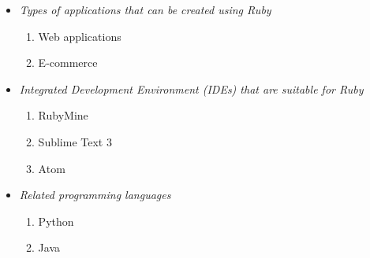 \documentclass{article}
\begin{document}
	
\begin{itemize}
	\item \textit{Types of applications that can be created using Ruby}
	\begin{enumerate}
		\item Web applications
		\item E-commerce
	\end{enumerate}
    \item \textit{Integrated Development Environment (IDEs) that are suitable for Ruby}
    \begin{enumerate}
    	\item RubyMine
    	\item Sublime Text 3
    	\item Atom
    \end{enumerate}
    \item \textit{Related programming languages}
    \begin{enumerate}
    	\item Python
    	\item Java
    \end{enumerate}
\end{itemize} 
	
\end{document}
